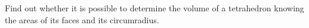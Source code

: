 Find out whether it is possible to determine the volume of a tetrahedron knowing the areas of its faces and its circumradius.